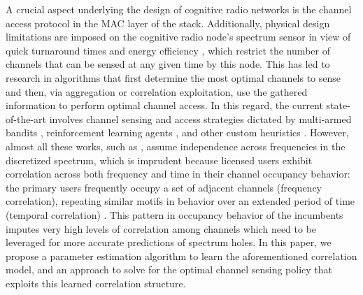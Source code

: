 \documentclass[10pt,twocolumn]{IEEEtran}
\begin{document}
A crucial aspect underlying the design of cognitive radio networks is the channel access protocol in the MAC layer of the stack. Additionally, physical design limitations are imposed on the cognitive radio node's spectrum sensor in view of quick turnaround times and energy efficiency \cite{5990482}, which restrict the number of channels that can be sensed at any given time by this node. This has led to research in algorithms that first determine the most optimal channels to sense and then, via aggregation or correlation exploitation, use the gathered information to perform optimal channel access. In this regard, the current state-of-the-art involves channel sensing and access strategies dictated by multi-armed bandits \cite{7094730}, reinforcement learning agents \cite{6507570}, and other custom heuristics \cite{6956794, 4554696}. However, almost all these works, such as \cite{7094730, 6507570}, assume independence across frequencies in the discretized spectrum, which is imprudent because licensed users exhibit correlation across both frequency and time in their channel occupancy behavior: the primary users frequently occupy a set of adjacent channels (frequency correlation), repeating similar motifs in behavior over an extended period of time (temporal correlation) \cite{6188346, 4213046,McHenry:2006:CSO:1234388.1234389}. This pattern in occupancy behavior of the incumbents imputes very high levels of correlation among channels which need to be leveraged for more accurate predictions of spectrum holes. In this paper, we propose a parameter estimation algorithm to learn the aforementioned correlation model, and an approach to solve for the optimal channel sensing policy that exploits this learned correlation structure.
\end{document}
